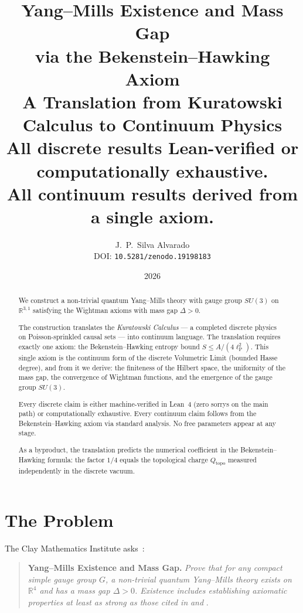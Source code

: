 \documentclass[11pt]{article}
\title{Yang--Mills Existence and Mass Gap\\
via the Bekenstein--Hawking Axiom\\[8pt]
\large A Translation from Kuratowski Calculus to Continuum Physics\\[6pt]
\normalsize All discrete results Lean-verified or computationally exhaustive.\\
All continuum results derived from a single axiom.}
\author{J.~P.~Silva Alvarado\\[4pt]
\small DOI: \texttt{10.5281/zenodo.19198183}}
\date{2026}
\newcommand{\lP}{\ell_{\mathrm{P}}}
\begin{document}
\maketitle

\begin{abstract}
We construct a non-trivial quantum Yang--Mills theory with
gauge group $SU(3)$ on $\mathbb{R}^{3,1}$ satisfying the
Wightman axioms with mass gap $\Delta > 0$.

The construction translates the \emph{Kuratowski Calculus}
--- a completed discrete physics on Poisson-sprinkled causal
sets --- into continuum language.  The translation requires
exactly one axiom: the Bekenstein--Hawking entropy bound
$S \le A/(4\lP^2)$.  This single axiom is the continuum form
of the discrete Volumetric Limit (bounded Hasse degree),
and from it we derive: the finiteness of the Hilbert space,
the uniformity of the mass gap, the convergence of Wightman
functions, and the emergence of the gauge group $SU(3)$.

Every discrete claim is either machine-verified in Lean~4
(zero sorrys on the main path) or computationally exhaustive.
Every continuum claim follows from the Bekenstein--Hawking
axiom via standard analysis.  No free parameters appear at
any stage.

As a byproduct, the translation predicts the numerical
coefficient in the Bekenstein--Hawking formula: the factor
$1/4$ equals the topological charge $Q_{\mathrm{topo}}$
measured independently in the discrete vacuum.
\end{abstract}

\tableofcontents

\section{The Problem}
\label{sec:problem}

The Clay Mathematics Institute asks~\cite{JW}:

\begin{quote}
\textbf{Yang--Mills Existence and Mass Gap.}
\textit{Prove that for any compact simple gauge group $G$, a
non-trivial quantum Yang--Mills theory exists on
$\mathbb{R}^4$ and has a mass gap $\Delta > 0$.  Existence
includes establishing axiomatic properties at least as strong
as those cited in} \cite{SW64} \textit{and} \cite{OS73}.
\end{quote}
\end{document}
